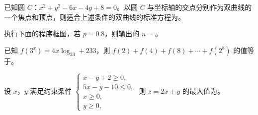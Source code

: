 \begin{question}
已知圆 $C$：$x^2+y^2-6x-4y+8=0$。以圆 $C$ 与坐标轴的交点分别作为双曲线的一个焦点和顶点，则适合上述条件的双曲线的标准方程为\gkblank{}。

\Needspace{0.4\textheight}
\end{question}
\begingroup
\renewenvironment{question}{\Needspace{0.4\textheight}}{}
\begin{question}
执行下面的程序框图，若 $p=0.8$，则输出的 $n=$\gkblank{}。
\nopagebreak[4]
\begin{center}\end{center}
\nopagebreak[4]
\end{question}
\endgroup
\begin{question}
已知 $f(3^x)=4x\log_23+233$，则 $f(2)+f(4)+f(8)+\cdots+f(2^8)$ 的值等于\gkblank{}。

\end{question}
\begin{question}
设 $x$，$y$ 满足约束条件 $\begin{cases}x-y+2\geqslant0,\\ 5x-y-10\leqslant0,\\ x\geqslant0,\\ y\geqslant0,\end{cases}$ 则 $z=2x+y$ 的最大值为\gkblank{}。

\end{question}

